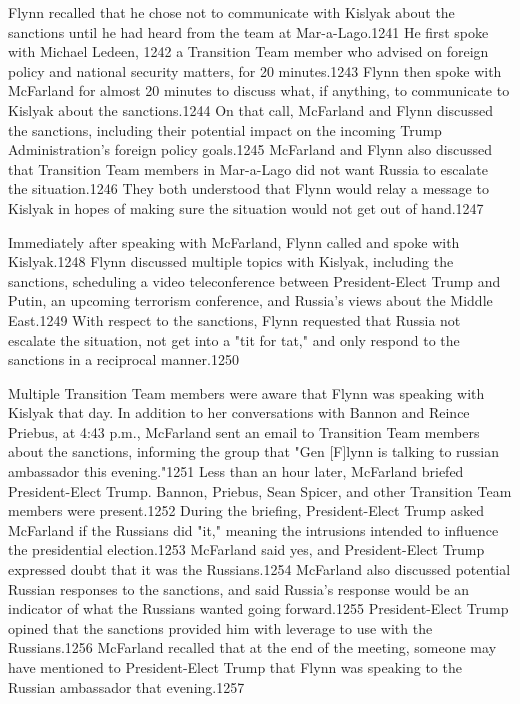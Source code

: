 Flynn recalled that he chose not to communicate with Kislyak about the sanctions until he had heard from the team at Mar-a-Lago.1241 He first spoke with Michael Ledeen, 1242 a Transition Team member who advised on foreign policy and national security matters, for 20 minutes.1243 Flynn then spoke with McFarland for almost 20 minutes to discuss what, if anything, to communicate to Kislyak about the sanctions.1244 On that call, McFarland and Flynn discussed the sanctions, including their potential impact on the incoming Trump Administration's foreign policy goals.1245 McFarland and Flynn also discussed that Transition Team members in Mar-a-Lago did not want Russia to escalate the situation.1246 They both understood that Flynn would relay a message to Kislyak in hopes of making sure the situation would not get out of hand.1247

Immediately after speaking with McFarland,  Flynn called and spoke with Kislyak.1248 Flynn discussed multiple topics with Kislyak, including the sanctions, scheduling a video teleconference between President-Elect Trump and Putin, an upcoming terrorism conference, and Russia's views about the Middle East.1249 With respect to the sanctions, Flynn requested that Russia not escalate the situation, not get into a "tit for tat," and only respond to the sanctions in a reciprocal manner.1250

Multiple Transition Team members were aware that Flynn was speaking with Kislyak that day. In addition to her conversations with Bannon and Reince Priebus,  at 4:43 p.m., McFarland sent an email to Transition Team members about the sanctions, informing the group that "Gen [F]lynn is talking to russian ambassador this evening."1251 Less than an hour later,  McFarland briefed President-Elect Trump. Bannon, Priebus, Sean Spicer, and other Transition Team members were present.1252 During the briefing, President-Elect Trump asked McFarland if the Russians did "it," meaning the intrusions intended to influence the presidential election.1253 McFarland said yes, and President-Elect Trump expressed doubt that it  was the Russians.1254 McFarland also discussed potential Russian responses to the sanctions, and said Russia's response would be an indicator of what the Russians wanted going forward.1255 President-Elect Trump opined that the sanctions provided him with leverage to use with the Russians.1256 McFarland recalled that at the end of the meeting, someone may have mentioned to President-Elect Trump that Flynn was speaking to the Russian ambassador that evening.1257


